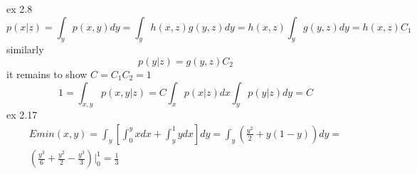 \documentclass[12pt]{article}
\begin{document}
ex 2.8
\begin{equation}
p(x|z) = \int_{y} p(x,y)dy = \int_{y}h(x,z)g(y,z)dy = h(x,z)\int_{y}g(y,z)dy = h(x,z)C_1
\end{equation}
similarly
\begin{equation}
p(y|z) = g(y,z)C_2
\end{equation}
it remains to show $C = C_1C_2 = 1$
\begin{equation}
1 = \int_{x,y}p(x,y|z) = C\int_{x}p(x|z)dx\int_{y}p(y|z)dy = C 
\end{equation}
ex 2.17
\begin{equation}
\begin{split}
Emin(x,y) = \int_{y}[\int_{0}^{y}xdx + \int_{y}^{1}ydx]dy = \int_{y}(\frac{y^2}{2} + y(1-y))dy =\\ 
(\frac{y^3}{6} + \frac{y^2}{2} - \frac{y^3}{3}) \biggr\rvert_{0}^{1} = \frac{1}{3}
\end{split}
\end{equation}
\end{document}
